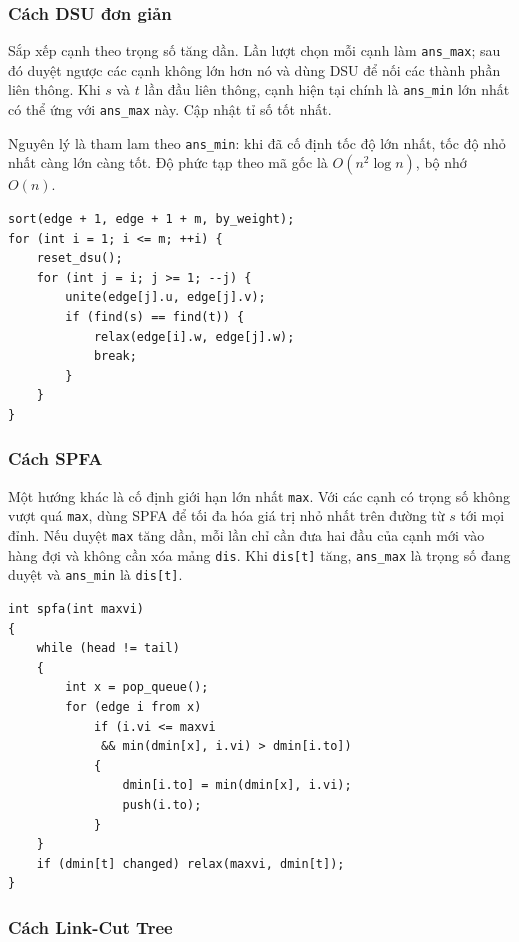 \documentclass[11pt]{article}
\begin{document}
\subsubsection*{Cách DSU đơn giản}

Sắp xếp cạnh theo trọng số tăng dần.  Lần lượt chọn mỗi cạnh làm
\texttt{ans\_max}; sau đó duyệt ngược các cạnh không lớn hơn nó và dùng DSU để
nối các thành phần liên thông.  Khi $s$ và $t$ lần đầu liên thông, cạnh hiện
tại chính là \texttt{ans\_min} lớn nhất có thể ứng với \texttt{ans\_max} này.
Cập nhật tỉ số tốt nhất.

Nguyên lý là tham lam theo \texttt{ans\_min}: khi đã cố định tốc độ lớn nhất,
tốc độ nhỏ nhất càng lớn càng tốt.  Độ phức tạp theo mã gốc là
$O(n^2\log n)$, bộ nhớ $O(n)$.

\begingroup
\small
\begin{verbatim}
sort(edge + 1, edge + 1 + m, by_weight);
for (int i = 1; i <= m; ++i) {
    reset_dsu();
    for (int j = i; j >= 1; --j) {
        unite(edge[j].u, edge[j].v);
        if (find(s) == find(t)) {
            relax(edge[i].w, edge[j].w);
            break;
        }
    }
}
\end{verbatim}
\endgroup

\subsubsection*{Cách SPFA}

Một hướng khác là cố định giới hạn lớn nhất \texttt{max}.  Với các cạnh có
trọng số không vượt quá \texttt{max}, dùng SPFA để tối đa hóa giá trị nhỏ nhất
trên đường từ $s$ tới mọi đỉnh.  Nếu duyệt \texttt{max} tăng dần, mỗi lần chỉ
cần đưa hai đầu của cạnh mới vào hàng đợi và không cần xóa mảng \texttt{dis}.
Khi \texttt{dis[t]} tăng, \texttt{ans\_max} là trọng số đang duyệt và
\texttt{ans\_min} là \texttt{dis[t]}.

\begingroup
\small
\begin{verbatim}
int spfa(int maxvi)
{
    while (head != tail)
    {
        int x = pop_queue();
        for (edge i from x)
            if (i.vi <= maxvi
             && min(dmin[x], i.vi) > dmin[i.to])
            {
                dmin[i.to] = min(dmin[x], i.vi);
                push(i.to);
            }
    }
    if (dmin[t] changed) relax(maxvi, dmin[t]);
}
\end{verbatim}
\endgroup

\subsubsection*{Cách Link-Cut Tree}
\end{document}
